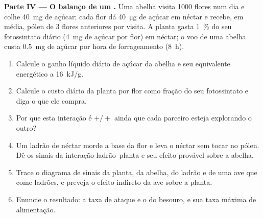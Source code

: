 \begin{problem}
\medskip
\noindent\textbf{Parte IV --- O balanço de um .}
Uma abelha visita 1000 flores num dia e colhe \qty{40}{mg} de açúcar;
cada flor dá \qty{40}{\micro g} de açúcar em néctar e recebe, em
média, pólen de 3 flores anteriores por visita. A planta gasta
\qty{1}{\%} do seu fotossintato diário (\qty{4}{mg} de açúcar por flor)
em néctar; o voo de uma abelha custa \qty{0.5}{mg} de açúcar por hora
de forrageamento (\qty{8}{h}).
\begin{enumerate}[resume]
  \item Calcule o ganho líquido diário de açúcar da abelha e seu
        equivalente energético a \qty{16}{kJ/g}.
  \item Calcule o custo diário da planta por flor como fração do seu
        fotossintato e diga o que ele compra.
  \item Por que esta interação é $+/+$ ainda que cada parceiro esteja
        explorando o outro?
  \item Um ladrão de néctar morde a base da flor e leva o néctar sem
        tocar no pólen. Dê os sinais da interação ladrão--planta e seu
        efeito provável sobre a abelha.
  \item Trace o diagrama de sinais da planta, da abelha, do ladrão e de
        uma ave que come ladrões, e preveja o efeito indireto da ave
        sobre a planta.
  \item Enuncie o resultado: a taxa de ataque e o 
        do besouro, e sua taxa máxima de alimentação.
\end{enumerate}
\end{problem}
